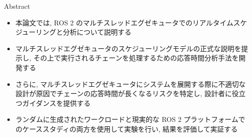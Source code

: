 
\begin{frame}{Abstract}
    \begin{itemize}
        \item 本論文では, ROS 2 のマルチスレッドエグゼキュータでのリアルタイムスケジューリングと分析について説明する
        \item マルチスレッドエグゼキュータのスケジューリングモデルの正式な説明を提示し, その上で実行されるチェーンを処理するための応答時間分析手法を開発する
        \item さらに, マルチスレッドエグゼキュータにシステムを展開する際に不適切な設計が原因でチェーンの応答時間が長くなるリスクを特定し, 設計者に役立つガイダンスを提供する
        \item ランダムに生成されたワークロードと現実的な ROS 2 プラットフォームでのケーススタディの両方を使用して実験を行い, 結果を評価して実証する
    \end{itemize}
\end{frame}
